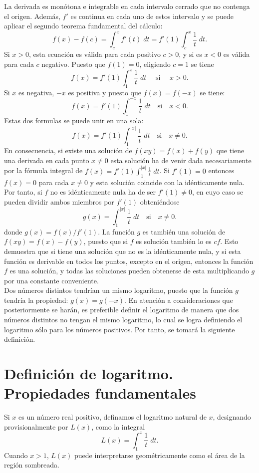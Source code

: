 La derivada es monótona e integrable en cada intervalo cerrado que no contenga el origen. Además, $f'$ es continua en cada uno de estos intervalo y se puede aplicar el segundo teorema fundamental del cálculo:
$$f(x)-f(c)=\int_c^x f'(t)\; dt = f'(1)\int_c^x \dfrac{1}{t}\; dt.$$
Si $x>0$, esta ecuación es válida para cada positivo $c>0$, y si es $x<0$ es válida para cada $c$ negativo. Puesto que $f(1)=0$, eligiendo $c=1$ se tiene
$$f(x)=f'(1)\int_1^x \dfrac{1}{t}\; dt\quad \mbox{ si } \quad x>0.$$
Si $x$ es negativa, $-x$ es positiva y puesto que $f(x)=f(-x)$ se tiene:
$$f(x)=f'(1)\int_1^{-x}\dfrac{1}{t}\; dt\quad \mbox{si}\quad x<0.$$
Estas dos formulas se puede unir en una sola:
$$f(x)=f'(1)\int_1^{|x|}\dfrac{1}{t}\; dt\quad \mbox{si}\quad x\neq 0.$$
En consecuencia, si existe una solución de $f(xy)=f(x)+f(y)$ que tiene una derivada en cada punto $x\neq 0$ esta solución ha de venir dada necesariamente por la fórmula integral de $f(x)=f'(1)\int_1^{|x|}\frac{1}{t}\; dt$. Si $f'(1)=0$ entonces $f(x)=0$ para cada $x\neq 0$ y esta solución coincide con la idénticamente nula. Por tanto, si $f$ no es idénticamente nula ha de ser $f'(1)\neq 0$, en cuyo caso se pueden dividir ambos miembros por $f'(1)$ obteniéndose
$$g(x)=\int_1^{|x|}\dfrac{1}{t}\; dt\quad \mbox{si}\quad x\neq 0.$$
donde $g(x)=f(x)/f'(1)$. La función $g$ es también una solución de $f(xy)=f(x)-f(y)$, puesto que si $f$ es solución también lo es $cf$. Esto demuestra que si tiene una solución que no es la idénticamente nula, y si esta función es derivable en todos los puntos, excepto en el origen, entonces la función $f$ es una solución, y todas las soluciones pueden obtenerse de esta multiplicando $g$ por una constante conveniente.\\

Dos números distintos tendrían un mismo logaritmo, puesto que la función $g$ tendría la propiedad: $g(x) = g( - x)$. En atención a consideraciones que posteriormente se harán, es preferible definir el logaritmo de manera que dos números distintos no tengan el  mismo logaritmo, lo cual se logra definiendo el logaritmo sólo para los números positivos. Por tanto, se tomará la siguiente definición.


\section{Definición de logaritmo. Propiedades fundamentales}

\begin{def.}
    Si $x$ es un número real positivo, definamos el logaritmo natural de $x$, designando provisionalmente por $L(x)$, como la integral
    $$L(x)=\int_1^{x}\dfrac{1}{t}\; dt.$$
    Cuando $x>1$, $L(x)$ puede interpretarse geométricamente como el área de la región sombreada.
\end{def.}

